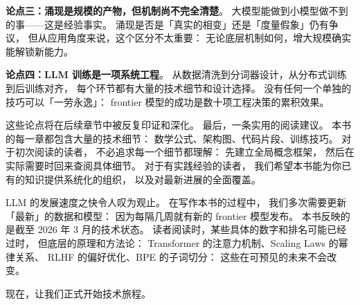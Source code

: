 \textbf{论点三：涌现是规模的产物，但机制尚不完全清楚}。
大模型能做到小模型做不到的事——这是经验事实。
涌现是否是「真实的相变」还是「度量假象」仍有争议，
但从应用角度来说，这个区分不太重要：
无论底层机制如何，增大规模确实能解锁新能力。

\textbf{论点四：LLM 训练是一项系统工程}。
从数据清洗到分词器设计，从分布式训练到后训练对齐，
每个环节都有大量的技术细节和设计选择。
没有任何一个单独的技巧可以「一劳永逸」：
frontier 模型的成功是数十项工程决策的累积效果。

这些论点将在后续章节中被反复印证和深化。
最后，一条实用的阅读建议。
本书的每一章都包含大量的技术细节：
数学公式、架构图、代码片段、训练技巧。
对于初次阅读的读者，
不必追求每一个细节都理解：
先建立全局概念框架，
然后在实际需要时回来查阅具体细节。
对于有实践经验的读者，
我们希望本书能为你已有的知识提供系统化的组织，
以及对最新进展的全面覆盖。

LLM 的发展速度之快令人叹为观止。
在写作本书的过程中，
我们多次需要更新「最新」的数据和模型：
因为每隔几周就有新的 frontier 模型发布。
本书反映的是截至 2026 年 3 月的技术状态。
读者阅读时，某些具体的数字和排名可能已经过时，
但底层的原理和方法论：
Transformer 的注意力机制、Scaling Laws 的幂律关系、
RLHF 的偏好优化、BPE 的子词切分：
这些在可预见的未来不会改变。

现在，让我们正式开始技术旅程。


